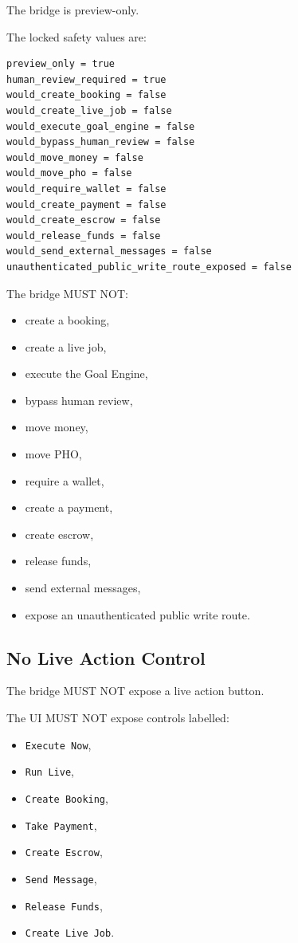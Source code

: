 The bridge is preview-only.

The locked safety values are:

\begin{verbatim}
preview_only = true
human_review_required = true
would_create_booking = false
would_create_live_job = false
would_execute_goal_engine = false
would_bypass_human_review = false
would_move_money = false
would_move_pho = false
would_require_wallet = false
would_create_payment = false
would_create_escrow = false
would_release_funds = false
would_send_external_messages = false
unauthenticated_public_write_route_exposed = false
\end{verbatim}

The bridge MUST NOT:

\begin{itemize}
  \item create a booking,
  \item create a live job,
  \item execute the Goal Engine,
  \item bypass human review,
  \item move money,
  \item move PHO,
  \item require a wallet,
  \item create a payment,
  \item create escrow,
  \item release funds,
  \item send external messages,
  \item expose an unauthenticated public write route.
\end{itemize}

\subsection{No Live Action Control}

The bridge MUST NOT expose a live action button.

The UI MUST NOT expose controls labelled:

\begin{itemize}
  \item \texttt{Execute Now},
  \item \texttt{Run Live},
  \item \texttt{Create Booking},
  \item \texttt{Take Payment},
  \item \texttt{Create Escrow},
  \item \texttt{Send Message},
  \item \texttt{Release Funds},
  \item \texttt{Create Live Job}.
\end{itemize}

